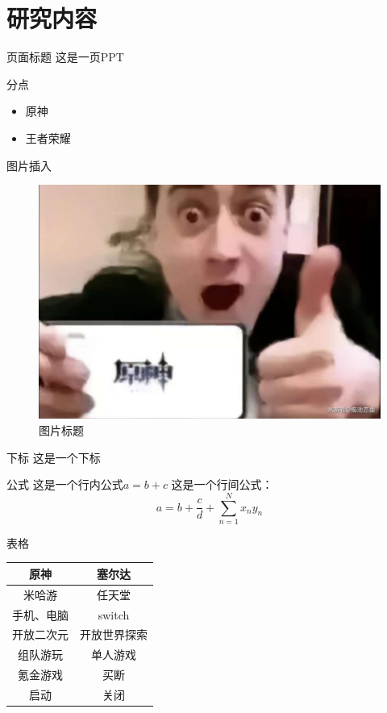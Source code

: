 \documentclass{beamer}
\begin{document}
\section{研究内容}

\begin{frame}{页面标题}
这是一页PPT
\end{frame}

\begin{frame}{分点}
\begin{itemize}
    \item 原神
    \item 王者荣耀
\end{itemize}
\end{frame}

\begin{frame}{图片插入}

\begin{figure}
    \centering 
    \includegraphics[width=0.75\linewidth]{pic/test.pdf} 
    \caption{图片标题}
\end{figure}

\end{frame}

\begin{frame}{下标}
    这是一个下标\footnotemark[1]
\end{frame}

\begin{frame}{公式}
    这是一个行内公式$a=b+c$
    这是一个行间公式：
    $$
    a=b+\frac{c}{d}+\sum _{n=1}^{N} x_ny_n
    $$
\end{frame}

\begin{frame}{表格}
\begin{table}[h]
    \centering
    \begin{tabular}{c|c}
        原神 & 塞尔达 \\
        \hline
        米哈游 & 任天堂 \\
        手机、电脑 & switch \\
        开放二次元 & 开放世界探索 \\
        组队游玩 & 单人游戏 \\
        氪金游戏 & 买断 \\
        启动 & 关闭 \\
    \end{tabular}
\end{table}
\end{frame}
\end{document}
